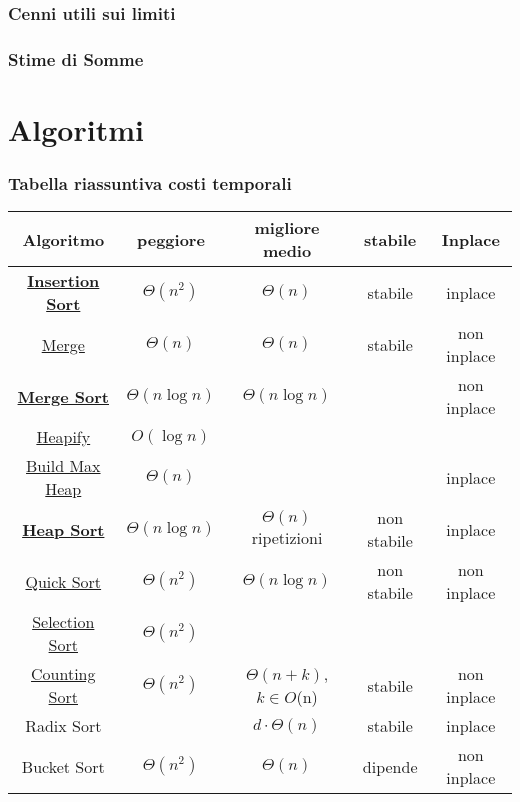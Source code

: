 \documentclass{article}
\begin{document}
\section{Cenni utili sui limiti}

\section{Stime di Somme}
\newpage
\part{Algoritmi}
\section{Tabella riassuntiva costi temporali} %
\begin{tabular}{|c|c|c|c|c|}
    \hline
    \textbf{Algoritmo} & \textbf{peggiore} & \textbf{ migliore medio} & \textbf{stabile } & \textbf{Inplace}\\
    \hline
    \hyperlink{insertionsort}{\textbf{Insertion Sort}} & $\Theta(n^2)$ & $\Theta(n)$ & stabile & inplace\\
    \hyperlink{merge}{Merge} & $\Theta(n)$ & $\Theta(n)$ & stabile & non inplace\\
    \hyperlink{mergesort}{\textbf{Merge Sort}}& $\Theta(n \log n)$ & $\Theta(n \log n)$ & & non inplace\\
    \hyperlink{heapify}{Heapify} & $O(\log n)$ & & & \\
    \hyperlink{buildmaxheap}{Build Max Heap} & $\Theta(n)$ & & & inplace \\ 
    \hyperlink{heapsort}{\textbf{Heap Sort}} & $\Theta(n \log n)$ & $\Theta(n)$ ripetizioni & non stabile & inplace\\
    \hyperlink{quicksort}{Quick Sort} & $\Theta(n^2)$ & $\Theta(n \log n)$ & non stabile &non inplace \\
    \hyperlink{selection}{Selection Sort} & $\Theta(n^2)$ & & & \\
    \hyperlink{countingsort}{Counting Sort} & $\Theta(n^2)$  & $\Theta(n+k)$, $k \in O$(n) & stabile & non inplace\\    
    Radix Sort &  & $d \cdot \Theta(n)$ & stabile & inplace \\
    Bucket Sort & $\Theta(n^2)$ & $\Theta(n)$ & dipende & non inplace\\
    \hline

\end{tabular}
\newpage
\end{document}
